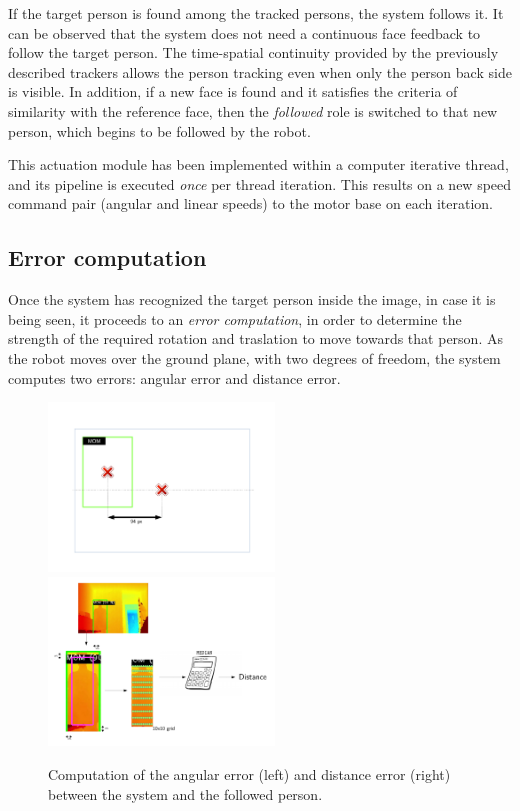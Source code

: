 If the target person is found among the tracked persons, the system follows it. It can be observed that the system does not need a continuous face feedback to follow the target person. The time-spatial continuity provided by the previously described trackers allows the person tracking even when only the person back side is visible. In addition, if a new face is found and it satisfies the criteria of similarity with the reference face, then the \emph{followed} role is switched to that new person, which begins to be followed by the robot.

This actuation module has been implemented within a computer iterative thread, and its pipeline is executed \emph{once} per thread iteration. This results on a new speed command pair (angular and linear speeds) to the motor base on each iteration.

\subsection{Error computation}

Once the system has recognized the target person inside the image, in case it is being seen, it proceeds to an \emph{error computation}, in order to determine the strength of the required rotation and traslation to move towards that person. As the robot moves over the ground plane, with two degrees of freedom, the system computes two errors: angular error and distance error.

\begin{figure}
  \centering
  \includegraphics[width=6cm]{images/h_error}
  \includegraphics[width=6cm]{images/distance_error}
  \caption{Computation of the angular error (left) and distance error (right) between the system and the followed person.}
  \label{fig:h_error}
\end{figure}

